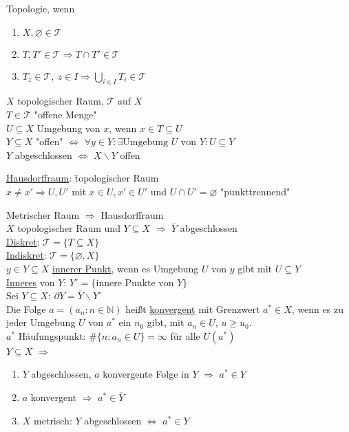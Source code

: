 \documentclass[a4paper]{article}
\newcommand{\ul}{\underline}
\begin{document}
Topologie, wenn
\begin{enumerate}[1)]
	\item $X,\varnothing\in\mathcal{T}$
	\item $T,T'\in\mathcal{T}\Rightarrow T\cap T'\in\mathcal{T}$
	\item $T_z\in\mathcal{T},\ z\in I\Rightarrow\bigcup_{i\in I}T_i\in\mathcal{T}$
\end{enumerate}
$X$ topologischer Raum, $\mathcal{T}$ auf $X$\\
$T\in\mathcal{T}$ "offene Menge"\\
$U\subseteq X$ Umgebung von $x$, wenn $x\in T\subseteq U$\\
$Y\subseteq X$ "offen" $\Leftrightarrow$ $\forall y\in Y:\exists\text{Umgebung }U\text{ von }Y:U\subseteq Y$\\
$Y$ abgeschlossen $\Leftrightarrow$ $X\backslash Y$ offen\\
\begin{tabbing}
	\ul{Hausdorffraum}: \=topologischer Raum\\
	\>$x\neq x'\Rightarrow U,U'$ mit $x\in U,x'\in U'$ und $U\cap U'=\varnothing$ "punkttrennend"
\end{tabbing}
Metrischer Raum $\Rightarrow$ Hausdorffraum\\
$X$ topologischer Raum und $Y\subseteq X$ $\Rightarrow$ $\overline{Y}$ abgeschlossen\\
\ul{Diskret}: $\mathcal{T}=\{T\subseteq X\}$\\
\ul{Indiskret}: $\mathcal{T}=\{\varnothing,X\}$\\
$y\in Y\subseteq X$ \ul{innerer Punkt}, wenn es Umgebung $U$ von $y$ gibt mit $U\subseteq Y$\\
\ul{Inneres} von $Y$: $Y^\circ=\{\text{innere Punkte von }Y\}$\\
Sei $Y\subseteq X$: $\partial Y=\overline{Y}\backslash Y^\circ$\\
Die Folge $a=(a_n:n\in\mathbb{N})$ heißt \ul{konvergent} mit Grenzwert $a^*\in X$, wenn es zu jeder Umgebung $U$ von $a^*$ ein $n_0$ gibt, mit $a_n\in U$, $u\geq u_0$.\\
$a^*$ Häufungspunkt: $\#\{n:a_n\in U\}=\infty$ für alle $U(a^*)$\\
$Y\subseteq X$ $\Rightarrow$
\begin{enumerate}[1)]
	\item $Y$ abgeschlossen, $a$ konvergente Folge in $Y$ $\Rightarrow$ $a^*\in Y$
	\item $a$ konvergent $\Rightarrow$ $a^*\in \overline{Y}$
	\item $X$ metrisch: $Y$ abgeschlossen $\Leftrightarrow$ $a^*\in Y$
\end{enumerate}
\end{document}
